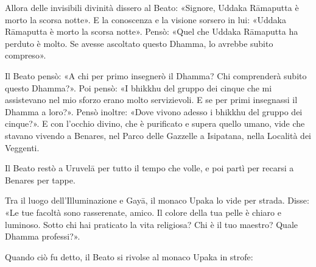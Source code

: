 Allora delle invisibili divinità dissero al Beato: «Signore, Uddaka Rāmaputta è
morto la scorsa notte». E la conoscenza e la visione sorsero in lui: «Uddaka
Rāmaputta è morto la scorsa notte». Pensò: «Quel che Uddaka Rāmaputta ha perduto
è molto. Se avesse ascoltato questo Dhamma, lo avrebbe subito compreso».

Il Beato pensò: «A chi per primo insegnerò il Dhamma? Chi comprenderà subito
questo Dhamma?». Poi pensò: «I bhikkhu del gruppo dei cinque che mi assistevano
nel mio sforzo erano molto servizievoli. E se per primi insegnassi il Dhamma a
loro?». Pensò inoltre: «Dove vivono adesso i bhikkhu del gruppo dei cinque?». E
con l’occhio divino, che è purificato e supera quello umano, vide che stavano
vivendo a Benares, nel Parco delle Gazzelle a Isipatana, nella Località dei
Veggenti.

Il Beato restò a Uruvelā per tutto il tempo che volle, e poi partì per recarsi a
Benares per tappe.

Tra il luogo dell’Illuminazione e Gayā, il monaco Upaka lo vide per strada.
Disse: «Le tue facoltà sono rasserenate, amico. Il colore della tua pelle è
chiaro e luminoso. Sotto chi hai praticato la vita religiosa? Chi è il tuo
maestro? Quale Dhamma professi?».

Quando ciò fu detto, il Beato si rivolse al monaco Upaka in strofe:

